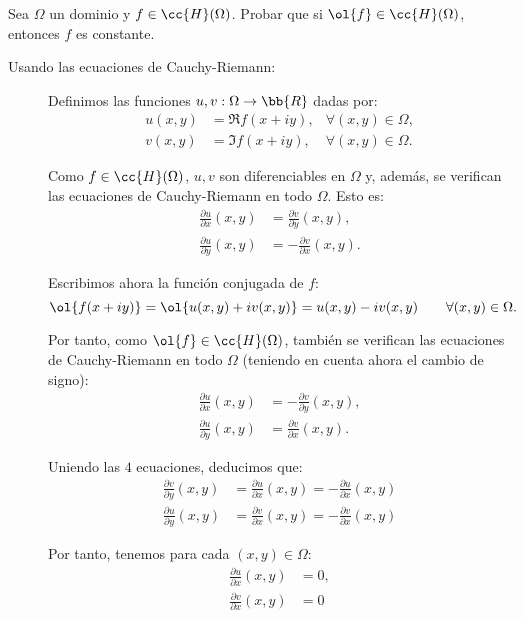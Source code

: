 \begin{ejercicio}
    Sea $\Omega$ un dominio y $f \in \cc{H}(\Omega)$. Probar que si $\ol{f} \in \cc{H}(\Omega)$, entonces $f$ es constante.
    \begin{description}
        \item[Usando las ecuaciones de Cauchy-Riemann:]
        
        Definimos las funciones $u,v:\Omega\to\bb{R}$ dadas por:
    \begin{align*}
        u(x,y) &= \Re f(x+iy),&\forall (x,y)\in\Omega,\\
        v(x,y) &= \Im f(x+iy),&\forall (x,y)\in\Omega.
    \end{align*}

    Como $f\in \cc{H}(\Omega)$, $u,v$ son diferenciables en $\Omega$ y, además, se verifican las ecuaciones de Cauchy-Riemann en todo $\Omega$. Esto es:
    \begin{align*}
        \frac{\partial u}{\partial x}(x,y) &= \frac{\partial v}{\partial y}(x,y),\\
        \frac{\partial u}{\partial y}(x,y) &= -\frac{\partial v}{\partial x}(x,y).
    \end{align*}

    Escribimos ahora la función conjugada de $f$:
    \[
        \ol{f(x+iy)} = \ol{u(x,y) + iv(x,y)} = u(x,y) - iv(x,y)\qquad \forall (x,y)\in\Omega.
    \]

    Por tanto, como $\ol{f}\in \cc{H}(\Omega)$, también se verifican las ecuaciones de Cauchy-Riemann en todo $\Omega$ (teniendo en cuenta ahora el cambio de signo):
    \begin{align*}
        \frac{\partial u}{\partial x}(x,y) &= -\frac{\partial v}{\partial y}(x,y),\\
        \frac{\partial u}{\partial y}(x,y) &= \frac{\partial v}{\partial x}(x,y).
    \end{align*}

    Uniendo las $4$ ecuaciones, deducimos que:
    \begin{align*}
        \frac{\partial v}{\partial y}(x,y) &= \frac{\partial u}{\partial x}(x,y) = -\frac{\partial u}{\partial x}(x,y)\\
        \frac{\partial u}{\partial y}(x,y) &= \frac{\partial v}{\partial x}(x,y) = - \frac{\partial v}{\partial x}(x,y)
    \end{align*}

    Por tanto, tenemos para cada $(x,y)\in\Omega$:
    \begin{align*}
        \frac{\partial u}{\partial x}(x,y) &= 0,\\
        \frac{\partial v}{\partial x}(x,y) &= 0
    \end{align*}


\end{description}
\end{ejercicio}
